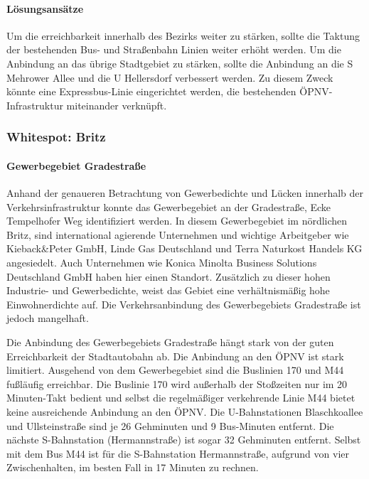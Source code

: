 \paragraph{Lösungsansätze}
Um die erreichbarkeit innerhalb des Bezirks weiter zu stärken, sollte die Taktung der bestehenden Bus- und Straßenbahn Linien weiter erhöht werden. Um die Anbindung an das übrige Stadtgebiet zu stärken, sollte die Anbindung an die S Mehrower Allee und die U Hellersdorf verbessert werden. Zu diesem Zweck könnte eine Expressbus-Linie eingerichtet werden, die bestehenden ÖPNV-Infrastruktur miteinander verknüpft.








\subsubsection{Whitespot: Britz}
\paragraph{Gewerbegebiet Gradestraße}
Anhand der genaueren Betrachtung von Gewerbedichte und Lücken innerhalb der Verkehrsinfrastruktur konnte das Gewerbegebiet an der Gradestraße, Ecke Tempelhofer Weg identifiziert werden. In diesem Gewerbegebiet im nördlichen Britz, sind international agierende Unternehmen und wichtige Arbeitgeber wie Kieback&Peter GmbH, Linde Gas Deutschland und Terra Naturkost Handels KG angesiedelt. Auch Unternehmen wie Konica Minolta Business Solutions Deutschland GmbH haben hier einen Standort. Zusätzlich zu dieser hohen Industrie- und Gewerbedichte, weist das Gebiet eine verhältnismäßig hohe Einwohnerdichte auf. Die Verkehrsanbindung des Gewerbegebiets Gradestraße ist jedoch mangelhaft.

Die Anbindung des Gewerbegebiets Gradestraße hängt stark von der guten Erreichbarkeit der Stadtautobahn ab. Die Anbindung an den ÖPNV ist stark limitiert. Ausgehend von dem Gewerbegebiet sind die Buslinien 170 und M44 fußläufig erreichbar. Die Buslinie 170 wird außerhalb der Stoßzeiten nur im 20 Minuten-Takt bedient und selbst die regelmäßiger verkehrende Linie M44 bietet keine ausreichende Anbindung an den ÖPNV. Die U-Bahnstationen Blaschkoallee und Ullsteinstraße sind je 26 Gehminuten und 9 Bus-Minuten entfernt. Die nächste S-Bahnstation (Hermannstraße) ist sogar 32 Gehminuten entfernt. Selbst mit dem Bus M44 ist für die S-Bahnstation Hermannstraße, aufgrund von vier Zwischenhalten, im besten Fall in 17 Minuten zu rechnen.

